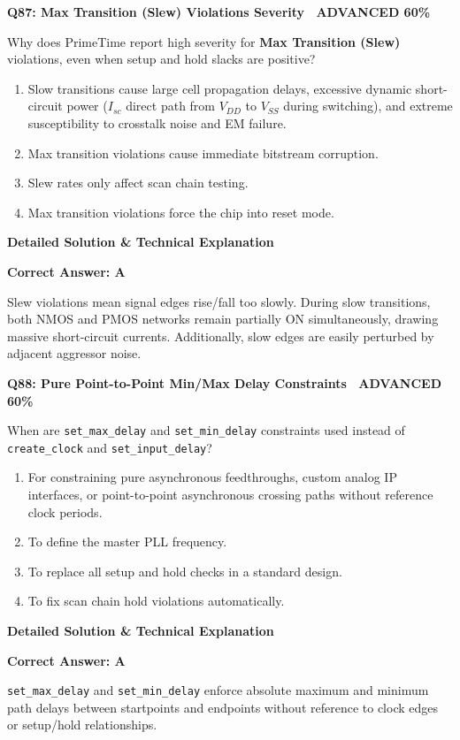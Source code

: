 \documentclass[11pt,a4paper]{article}
\newcommand{\badgeadv}{{\color{white}\colorbox{advred}{\bfseries\sffamily\tiny\ ADVANCED 60\%\ }}}
\newenvironment{qbox}[2]{%
  \begin{mdframed}[style=qstyle]%
  {\bfseries\sffamily\color{primaryblue}#1 \hfill #2}\par\vspace{2pt}%
}{%
  \end{mdframed}%
}
\newenvironment{ansbox}{%
  \begin{mdframed}[style=ansstyle]%
  {\bfseries\sffamily\color{ansgreen}\small Detailed Solution \& Technical Explanation}\par\vspace{2pt}\small%
}{%
  \end{mdframed}%
}
\begin{document}
\begin{qbox}{Q87: Max Transition (Slew) Violations Severity}{\badgeadv}
Why does PrimeTime report high severity for \textbf{Max Transition (Slew)} violations, even when setup and hold slacks are positive?
\begin{enumerate}[label=\textbf{\Alph*.}]
  \item Slow transitions cause large cell propagation delays, excessive dynamic short-circuit power ($I_{sc}$ direct path from $V_{DD}$ to $V_{SS}$ during switching), and extreme susceptibility to crosstalk noise and EM failure.
  \item Max transition violations cause immediate bitstream corruption.
  \item Slew rates only affect scan chain testing.
  \item Max transition violations force the chip into reset mode.
\end{enumerate}
\end{qbox}
\begin{ansbox}
\textbf{Correct Answer: A}

Slew violations mean signal edges rise/fall too slowly. During slow transitions, both NMOS and PMOS networks remain partially ON simultaneously, drawing massive short-circuit currents. Additionally, slow edges are easily perturbed by adjacent aggressor noise.
\end{ansbox}

\begin{qbox}{Q88: Pure Point-to-Point Min/Max Delay Constraints}{\badgeadv}
When are \texttt{set\_max\_delay} and \texttt{set\_min\_delay} constraints used instead of \texttt{create\_clock} and \texttt{set\_input\_delay}?
\begin{enumerate}[label=\textbf{\Alph*.}]
  \item For constraining pure asynchronous feedthroughs, custom analog IP interfaces, or point-to-point asynchronous crossing paths without reference clock periods.
  \item To define the master PLL frequency.
  \item To replace all setup and hold checks in a standard design.
  \item To fix scan chain hold violations automatically.
\end{enumerate}
\end{qbox}
\begin{ansbox}
\textbf{Correct Answer: A}

\texttt{set\_max\_delay} and \texttt{set\_min\_delay} enforce absolute maximum and minimum path delays between startpoints and endpoints without reference to clock edges or setup/hold relationships.
\end{ansbox}
\end{document}
